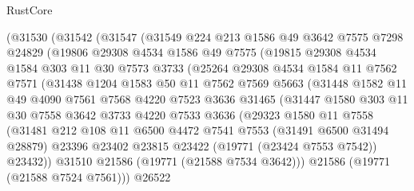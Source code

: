 \begin{lexlean}{RustCore}
\begin{coremodule}
      (@31530
        (@31542
          (@31547
            (@31549
              @224
              @213
              @1586
              @49
              @3642
              @7575
              @7298
              @24829
              (@19806
                @29308
                @4534
                @1586
                @49
                @7575
                (@19815
                  @29308
                  @4534
                  @1584
                  @303
                  @11
                  @30
                  @7573
                  @3733
                  (@25264
                    @29308
                    @4534
                    @1584
                    @11
                    @7562
                    @7571
                    (@31438
                      @1204
                      @1583
                      @50
                      @11
                      @7562
                      @7569
                      @5663
                      (@31448
                        @1582
                        @11
                        @49
                        @4090
                        @7561
                        @7568
                        @4220
                        @7523
                        @3636
                        @31465
                        (@31447
                          @1580
                          @303
                          @11
                          @30
                          @7558
                          @3642
                          @3733
                          @4220
                          @7533
                          @3636
                          (@29323
                            @1580
                            @11
                            @7558
                            (@31481
                              @212
                              @108
                              @11
                              @6500
                              @4472
                              @7541
                              @7553
                              (@31491 @6500 @31494 @28879)
                              @23396
                              @23402
                              @23815
                              @23422
                              (@19771 (@23424 @7553 @7542))
                              @23432))
                          @31510
                          @21586
                          (@19771 (@21588 @7534 @3642)))
                        @21586
                        (@19771 (@21588 @7524 @7561)))
                      @26522

\end{coremodule}
\end{lexlean}
